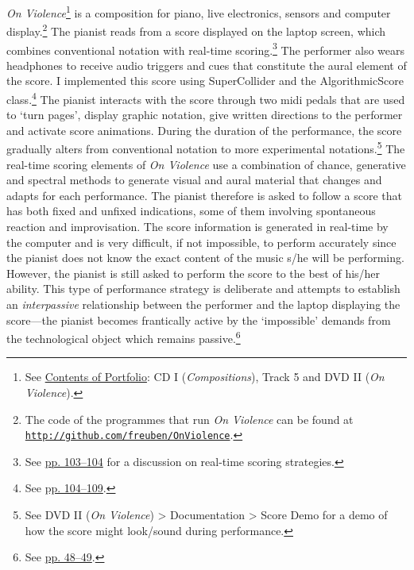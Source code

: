  \emph{On Violence}\footnote{See \hyperlink{portfolio}{Contents of Portfolio}: CD I (\emph{Compositions}), Track 5 and DVD II (\emph{On Violence}).} is a composition for piano, live electronics, sensors and computer display.\footnote{The code of the programmes that run \emph{On Violence} can be found at \href{http://github.com/freuben/OnViolence}{\texttt {http://github.com/freuben/OnViolence}}.} The pianist reads from a score displayed on the laptop screen, which combines conventional notation with real-time scoring.\footnote{See \hyperlink{realtimescore}{pp. 103--104} for a discussion on real-time scoring strategies.} The performer also wears headphones to receive audio triggers and cues that constitute the aural element of the score. I implemented this score using SuperCollider and the AlgorithmicScore class.\footnote{See \hyperlink{algoscore}{pp. 104--109}.} The pianist interacts with the score through two midi pedals that are used to `turn pages', display graphic notation, give written directions to the performer and activate score animations. During the duration of the performance, the score gradually alters from conventional notation to more experimental notations.\footnote{See DVD II (\emph{On Violence}) \tiny \textgreater \footnotesize \hspace{0pt} Documentation \tiny \textgreater \footnotesize \hspace{0pt} Score Demo for a demo of how the score might look/sound during performance.} The real-time scoring elements of \emph{On Violence} use a combination of chance, generative and spectral methods to generate visual and aural material that changes and adapts for each performance. The pianist therefore is asked to follow a score that has both fixed and unfixed indications, some of them involving spontaneous reaction and improvisation. The score information is generated in real-time by the computer and is very difficult, if not impossible, to perform accurately since the pianist does not know the exact content of the music s/he will be performing. However, the pianist is still asked to perform the score to the best of his/her ability. This type of performance strategy is deliberate and attempts to establish an \emph{interpassive} relationship between the performer and the laptop displaying the score---the pianist becomes frantically active by the `impossible' demands from the technological object which remains passive.\footnote{See \hyperlink{zizekinterpassiv}{pp. 48--49}.}

